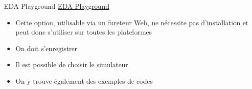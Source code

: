 \documentclass[presentation]{beamer}
\begin{document}
\begin{frame}[label={sec:org614139c}]{EDA Playground}
\href{https://www.edaplayground.com/n}{EDA Playground}

\begin{itemize}
\item Cette option, utilisable via un fureteur Web, ne nécessite pas d'installation et peut donc s'utiliser sur toutes les plateformes
\item On doit s'enregistrer
\item Il est possible de choisir le simulateur
\item On y trouve également des exemples de codes
\end{itemize}
\end{frame}
\end{document}
